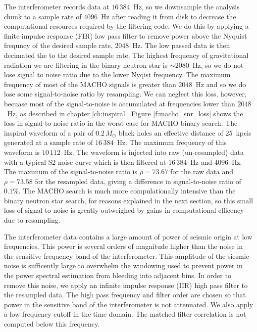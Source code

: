 The interferometer records data at $16\,384$~Hz, so we downsample the analysis
chunk to a sample rate of $4096$~Hz after reading it from disk to decrease the
computational resources required by the filtering code.  We do this by
applying a finite impulse response (FIR) low pass filter to remove power above
the Nyquist frequncy of the desired sample rate, $2048$~Hz. The low passed
data is then decimated the to the desired sample rate. The highest frequency
of gravitational radiation we are filtering in the binary neutron star is
$\sim 2080$~Hz, so we do not lose signal to noise ratio due to the lower
Nyqist frequency. The maximum frequency of most of the MACHO signals is
greater than $2048$~Hz and so we do lose some signal-to-noise ratio by
resampling. We can neglect this loss, however, becuase most of the
signal-to-noise is accumulated at frequencies lower than $2048$~Hz, as
described in chapter \ref{ch:inspiral}. Figure \ref{f:macho_snr_loss} shows
the loss in signal-to-noise ratio in the worst case for MACHO binary search.
The inspiral waveform of a pair of $0.2\,M_\odot$ black holes an effective
distance of $25$~kpcis generated at a sample rate of $16\,384$~Hz. The maximum
frequency of this waveform is $10\,112$~Hz. The waveform is injected into raw
(un-resampled) data with a typical S2 noise curve which is then filtered at
$16\,384$~Hz and $4096$~Hz. The maximum of the signal-to-noise ratio is $\rho
= 73.67$ for the raw data and $\rho = 73.58$ for the resampled data, giving a
difference in signal-to-noise ratio of $0.1\%$. The MACHO search is much more
compulationally intensive than the binary neutron star search, for reasons
explained in the next section, so this small loss of signal-to-noise is
greatly outweighed by gains in computational efficency due to resampling.

The interferometer data contains a large amount of power of seismic origin at
low frequencies.  This power is several orders of magnitude higher than the
noise in the sensitive frequency band of the interferometer. This amplitude of
the siesmic noise is sufficently large to overwhelm the windowing used to
prevent power in the power spectral estimation from bleeding into adjacent
bins. In order to remove this noise, we apply an infinite impulse response
(IIR) high pass filter to the resampled data. The high pass frequency and
filter order are chosen so that power in the sensitive band of the
interferometer is not attenuated. We also apply a low frequency cutoff in the
time domain. The matched filter correlation is not computed below this
frequency.

